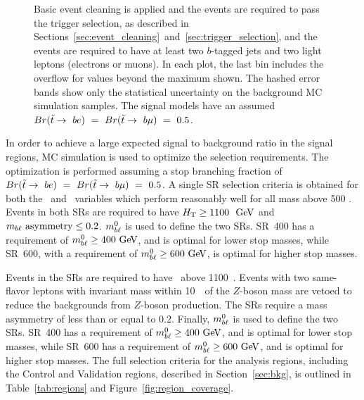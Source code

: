 \begin{figure}
{    Basic event cleaning is applied and the events are required to pass the
    trigger selection, as described in
    Sections~\ref{sec:event_cleaning}~and~\ref{sec:trigger_selection}, and the
    events are required to have at least two $b$-tagged jets and two light
    leptons (electrons or muons).
    In each plot, the last bin includes the overflow for values beyond the
    maximum shown. The hashed error bands show only the statistical
    uncertainty on the background MC simulation samples. The signal
    models have an assumed
    $Br(\tilde{t}\rightarrow~be)~=~Br(\tilde{t}\rightarrow~b\mu)~=~0.5$.
  }
  \label{fig:no_data__no_k__inclusive_flavor_all__kinematic_dists}
\end{figure}

In order to achieve a large expected signal to background ratio in the signal
regions, MC simulation is used to optimize the selection requirements.
The optimization is performed assuming a stop branching fraction of
$Br(\tilde{t}\rightarrow~be)~=~Br(\tilde{t}\rightarrow~b\mu)~=~0.5$.
A single SR selection criteria is obtained for both the \HT\ and
\MBLASYM\ variables which perform reasonably well for all mass above 500 \GeV.
Events in both SRs are required to have $\HT \geq 1100~\GeV$ and
$m_{b\ell}~\mathrm{asymmetry} \leq 0.2$.
$m_{b\ell}^0$ is used to define the two SRs.
SR~400 has a requirement of $\MBL^0 \geq 400 \GeV$, and is optimal for lower
stop masses, while SR~600, with a requirement of $\MBL^0 \geq 600 \GeV$, is
optimal for higher stop masses.

Events in the SRs are required to have \HT\ above 1100~\GeV.
Events with two same-flavor leptons with invariant mass within 10~\GeV\ of the
$Z$-boson mass are vetoed to reduce the backgrounds from $Z$-boson production.
The SRs require a mass asymmetry of less than or equal to 0.2.
Finally, $m_{b\ell}^0$ is used to define the two SRs.
SR~400 has a requirement of $\MBL^0 \geq 400 \GeV$, and is optimal for lower
stop masses, while SR~600 has a requirement of $\MBL^0 \geq 600 \GeV$, and is
optimal for higher stop masses.
The full selection criteria for the analysis regions, including the Control and
Validation regions, described in Section~\ref{sec:bkg}, is outlined in
Table~\ref{tab:regions} and Figure~\ref{fig:region_coverage}.

